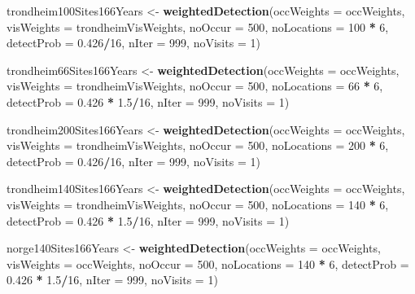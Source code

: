 \documentclass[]{article}
\newenvironment{Shaded}{\begin{snugshade}}{\end{snugshade}}
\newcommand{\KeywordTok}[1]{\textcolor[rgb]{0.13,0.29,0.53}{\textbf{#1}}}
\newcommand{\DataTypeTok}[1]{\textcolor[rgb]{0.13,0.29,0.53}{#1}}
\newcommand{\DecValTok}[1]{\textcolor[rgb]{0.00,0.00,0.81}{#1}}
\newcommand{\FloatTok}[1]{\textcolor[rgb]{0.00,0.00,0.81}{#1}}
\newcommand{\StringTok}[1]{\textcolor[rgb]{0.31,0.60,0.02}{#1}}
\newcommand{\OperatorTok}[1]{\textcolor[rgb]{0.81,0.36,0.00}{\textbf{#1}}}
\newcommand{\NormalTok}[1]{#1}
\begin{document}
\begin{Shaded}
\begin{Highlighting}[]
\NormalTok{trondheim100Sites166Years <-}\StringTok{ }\KeywordTok{weightedDetection}\NormalTok{(}\DataTypeTok{occWeights =}\NormalTok{ occWeights, }\DataTypeTok{visWeights =}\NormalTok{ trondheimVisWeights, }
    \DataTypeTok{noOccur =} \DecValTok{500}\NormalTok{, }\DataTypeTok{noLocations =} \DecValTok{100} \OperatorTok{*}\StringTok{ }\DecValTok{6}\NormalTok{, }\DataTypeTok{detectProb =} \FloatTok{0.426}\OperatorTok{/}\DecValTok{16}\NormalTok{, }\DataTypeTok{nIter =} \DecValTok{999}\NormalTok{, }
    \DataTypeTok{noVisits =} \DecValTok{1}\NormalTok{)}


\NormalTok{trondheim66Sites166Years <-}\StringTok{ }\KeywordTok{weightedDetection}\NormalTok{(}\DataTypeTok{occWeights =}\NormalTok{ occWeights, }\DataTypeTok{visWeights =}\NormalTok{ trondheimVisWeights, }
    \DataTypeTok{noOccur =} \DecValTok{500}\NormalTok{, }\DataTypeTok{noLocations =} \DecValTok{66} \OperatorTok{*}\StringTok{ }\DecValTok{6}\NormalTok{, }\DataTypeTok{detectProb =} \FloatTok{0.426} \OperatorTok{*}\StringTok{ }\FloatTok{1.5}\OperatorTok{/}\DecValTok{16}\NormalTok{, }\DataTypeTok{nIter =} \DecValTok{999}\NormalTok{, }
    \DataTypeTok{noVisits =} \DecValTok{1}\NormalTok{)}

\NormalTok{trondheim200Sites166Years <-}\StringTok{ }\KeywordTok{weightedDetection}\NormalTok{(}\DataTypeTok{occWeights =}\NormalTok{ occWeights, }\DataTypeTok{visWeights =}\NormalTok{ trondheimVisWeights, }
    \DataTypeTok{noOccur =} \DecValTok{500}\NormalTok{, }\DataTypeTok{noLocations =} \DecValTok{200} \OperatorTok{*}\StringTok{ }\DecValTok{6}\NormalTok{, }\DataTypeTok{detectProb =} \FloatTok{0.426}\OperatorTok{/}\DecValTok{16}\NormalTok{, }\DataTypeTok{nIter =} \DecValTok{999}\NormalTok{, }
    \DataTypeTok{noVisits =} \DecValTok{1}\NormalTok{)}

\NormalTok{trondheim140Sites166Years <-}\StringTok{ }\KeywordTok{weightedDetection}\NormalTok{(}\DataTypeTok{occWeights =}\NormalTok{ occWeights, }\DataTypeTok{visWeights =}\NormalTok{ trondheimVisWeights, }
    \DataTypeTok{noOccur =} \DecValTok{500}\NormalTok{, }\DataTypeTok{noLocations =} \DecValTok{140} \OperatorTok{*}\StringTok{ }\DecValTok{6}\NormalTok{, }\DataTypeTok{detectProb =} \FloatTok{0.426} \OperatorTok{*}\StringTok{ }\FloatTok{1.5}\OperatorTok{/}\DecValTok{16}\NormalTok{, }\DataTypeTok{nIter =} \DecValTok{999}\NormalTok{, }
    \DataTypeTok{noVisits =} \DecValTok{1}\NormalTok{)}

\NormalTok{norge140Sites166Years <-}\StringTok{ }\KeywordTok{weightedDetection}\NormalTok{(}\DataTypeTok{occWeights =}\NormalTok{ occWeights, }\DataTypeTok{visWeights =}\NormalTok{ occWeights, }
    \DataTypeTok{noOccur =} \DecValTok{500}\NormalTok{, }\DataTypeTok{noLocations =} \DecValTok{140} \OperatorTok{*}\StringTok{ }\DecValTok{6}\NormalTok{, }\DataTypeTok{detectProb =} \FloatTok{0.426} \OperatorTok{*}\StringTok{ }\FloatTok{1.5}\OperatorTok{/}\DecValTok{16}\NormalTok{, }\DataTypeTok{nIter =} \DecValTok{999}\NormalTok{, }
    \DataTypeTok{noVisits =} \DecValTok{1}\NormalTok{)}



\end{Highlighting}
\end{Shaded}
\end{document}
